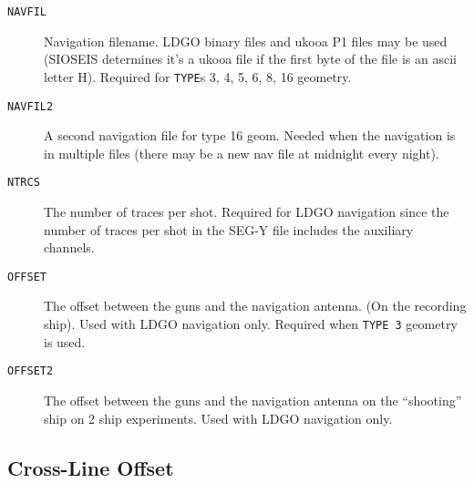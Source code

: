 \begin{description}
\item[\texttt{NAVFIL}] Navigation filename.  LDGO binary files and \gls{ukooa} P1 files
         may be used (SIOSEIS determines it's a \gls{ukooa} file if the
         first byte of the file is an \gls{ascii} letter H).
         Required for \texttt{TYPE}s 3, 4, 5, 6, 8, 16 geometry.
\item[\texttt{NAVFIL2}] A second navigation file for type 16 geom.  Needed when the
         navigation is in multiple files (there may be a new nav file
         at midnight every night).

\item[\texttt{NTRCS}] The number of traces per \gls{shot}.  Required for LDGO navigation
         since the number of traces per \gls{shot} in the SEG-Y file includes
         the auxiliary channels.

\item[\texttt{OFFSET}] The offset between the guns and the navigation antenna.  (On
         the recording ship).  Used with LDGO navigation only.
         Required when \texttt{TYPE 3} geometry is used.

\item[\texttt{OFFSET2}] The offset between the guns and the navigation antenna on the
          ``shooting'' ship on 2 ship experiments.  Used with LDGO
          navigation only.
\end{description}

\subsection{Cross-Line Offset}

